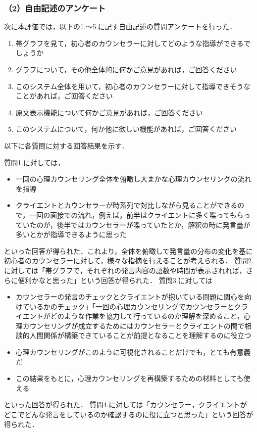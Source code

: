 \documentclass[shuuron]{kuee}
\begin{document}

\subsubsection{（2）自由記述のアンケート}

次に本評価では，以下の1.〜5.に記す自由記述の質問アンケートを行った．

\begin{enumerate}
  \item 帯グラフを見て，初心者のカウンセラーに対してどのような指導ができるでしょうか
  \item グラフについて，その他全体的に何かご意見があれば，ご回答ください
  \item このシステム全体を用いて，初心者のカウンセラーに対して指導できそうなことがあれば，ご回答ください
  \item 原文表示機能について何かご意見があれば，ご回答ください
  \item このシステムについて，何か他に欲しい機能があれば，ご回答ください
\end{enumerate}

以下に各質問に対する回答結果を示す．

質問1.に対しては，
\begin{itemize}

  \item 一回の心理カウンセリング全体を俯瞰し大まかな心理カウンセリングの流れを指導
  \item クライエントとカウンセラーが時系列で対比しながら見ることができるので，一回の面接での流れ，例えば，前半はクライエントに多く喋ってもらっていたのが，後半ではカウンセラーが喋っていたとか，解釈の時に発言量が多いとかが指導できるように思った
\end{itemize}
といった回答が得られた．これより，全体を俯瞰して発言量の分布の変化を基に初心者のカウンセラーに対して，様々な指摘を行えることが考えられる．
質問2.に対しては「帯グラフで，それぞれの発言内容の語数や時間が表示されれば，さらに便利かなと思った」という回答が得られた．
質問3.に対しては

\begin{itemize}

  \item カウンセラーの発言のチェックとクライエントが抱いている問題に関心を向けているかのチェック」「一回の心理カウンセリングでカウンセラーとクライエントがどのような作業を協力して行っているのか理解を深めること，心理カウンセリングが成立するためにはカウンセラーとクライエントの間で相談的人間関係が構築できていることが前提となることを理解するのに役立つ
  \item 心理カウンセリングがこのように可視化されることだけでも，とても有意義だ
  \item この結果をもとに，心理カウンセリングを再構築するための材料としても使える
\end{itemize}
といった回答が得られた．
質問4.に対しては「カウンセラー，クライエントがどこでどんな発言をしているのか確認するのに役に立つと思った」という回答が得られた．
\end{document}
